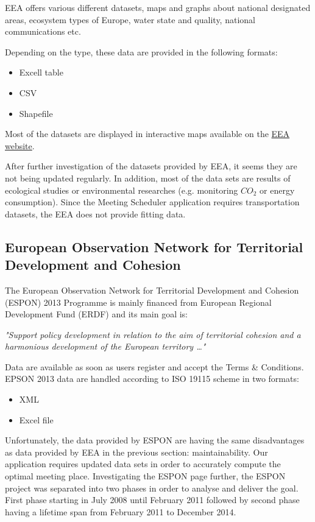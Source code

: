 \documentclass[thesis=M,english]{FITthesis}[2012/10/20]
\begin{document}
EEA offers various different datasets, maps and graphs about national designated areas, ecosystem types of Europe, water state and quality, national communications etc. 

Depending on the type, these data are provided in the following formats:
\begin{itemize}
\item Excell table
\item CSV
\item Shapefile
\end{itemize} 

Most of the datasets are displayed in interactive maps available on the \href{http://www.eea.europa.eu/data-and-maps}{EEA website}.

After further investigation of the datasets provided by EEA, it seems they are not being updated regularly. In addition, most of the data sets are results of ecological studies or environmental researches (e.g. monitoring $CO_{2}$ or energy consumption). Since the Meeting Scheduler application requires transportation datasets, the EEA does not provide fitting data.

\subsection{European Observation Network for Territorial Development and Cohesion}
The European Observation Network for Territorial Development and Cohesion (ESPON) 2013 Programme is mainly financed from European Regional Development Fund (ERDF) and its main goal is:

\textit{"Support policy development in relation to the aim of territorial cohesion and a harmonious development of the European territory \ldots "} \cite{ESPON13}

Data are available as soon as users register and accept the Terms \& Conditions. EPSON 2013 data are handled according to ISO 19115 scheme in two formats:

\begin{itemize}
\item XML
\item Excel file
\end{itemize}

Unfortunately, the data provided by ESPON are having the same disadvantages as data provided by EEA in the previous section: maintainability. Our application requires updated data sets in order to accurately compute the optimal meeting place. Investigating the ESPON page further, the ESPON project was separated into two phases in order to analyse and deliver the goal. First phase starting in July 2008 until February 2011 followed by second phase having a lifetime span from February 2011 to December 2014. 
\end{document}
